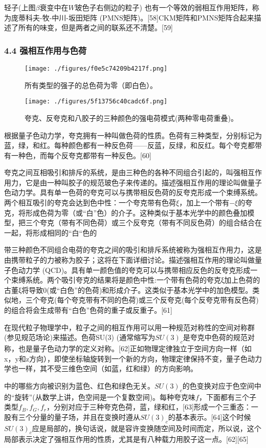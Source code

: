 轻子(上图$\beta$衰变中在$W$玻色子右侧边的粒子) 也有一个等效的弱相互作用矩阵，称为庞蒂科夫-牧-中川-坂田矩阵 (PMNS矩阵)。[58]CKM矩阵和PMNS矩阵合起来描述了所有的味变，但是两者之间的联系还不清楚。[59]

\subsubsection{4.4 强相互作用与色荷}
\begin{figure}[ht]
\centering
\texttt{[image: ./figures/f0e5c74209b4217f.png]}
\caption{所有类型的强子的总色荷为零（即白色）。} \label{fig_Quark_8}
\end{figure}

\begin{figure}[ht]
\centering
\texttt{[image: ./figures/5f13756c40cadc6f.png]}
\caption{夸克、反夸克和八胶子的三种颜色的强电荷模式(两种零电荷重叠)。} \label{fig_Quark_9}
\end{figure}

根据量子色动力学，夸克拥有一种叫做色荷的性质。色荷有三种类型，分别标记为蓝，绿，和红。每种颜色都有一种反色荷——反蓝，反绿，和反红。每个夸克都带有一种色，而每个反夸克都带有一种反色。[60]

夸克之间互相吸引和排斥的系统，是由三种色的各种不同组合引起的，叫强相互作用力，它是由一种叫胶子的规范玻色子来传递的。描述强相互作用的理论叫做量子色动力学。具有单一色荷的夸克可以与携带相反色荷的反夸克形成一个束缚系统。两个相互吸引的夸克会达到色中性：一个夸克带有色荷$\xi$，加上一个带有$-\xi$的夸克，将形成色荷为零（或“白”色）的介子。这种类似于基本光学中的颜色叠加模型，把三个夸克（带有不同色荷）或三个反夸克（带有不同反色荷）的组合结合在一起，将形成相同的“白“色的

带三种颜色不同组合电荷的夸克之间的吸引和排斥系统被称为强相互作用力，这是由携带粒子的力被称为胶子；这将在下面详细讨论。描述强相互作用的理论叫做量子色动力学 (QCD)。具有单一颜色值的夸克可以与携带相应反色的反夸克形成一个束缚系统。两个吸引夸克的结果将是颜色中性:一个带有色荷的夸克ξ加上色荷的古董ξ将导致0(或“白色”的色荷)和形成介子。这类似于基本光学中的加色模型。类似地，三个夸克(每个夸克带有不同的色荷)或三个反夸克(每个反夸克带有反色荷)的组合将会生成带有“白色”色荷的重子或反重子。[61]

在现代粒子物理学中，粒子之间的相互作用可以用一种规范对称性的空间对称群(参见规范场论)来描述。色荷SU(3) (通常缩写为$SU(3)_c$是夸克中色荷的规范对称，也是量子色动力学的定义对称。[62]正如物理定律独立于空间方向一样（如x，y和z方向），即使坐标轴旋转到一个新的方向，物理定律保持不变，量子色动力学也一样，其不受三维色空间（如蓝，红和绿）的方向影响。

中的哪些方向被识别为蓝色、红色和绿色无关。$SU(3)_c$的色变换对应于色空间中的“旋转”(从数学上讲，色空间是一个复数空间)。每种夸克味$f$，下面都有三个子类型$f_{B},f_{G},f_{r}$，分别对应于三种夸克色荷，蓝，绿和红，[63]形成一个三重态：一股有三个分量的量子场，并且在变换时遵从$SU(3)_c$的基本表示。[64]这个时候$SU(3)_c$应是局部的，换句话说，就是容许变换随空间及时间而定，所以说，这个局部表示决定了强相互作用的性质，尤其是有八种载力用胶子这一点。[62][65]





